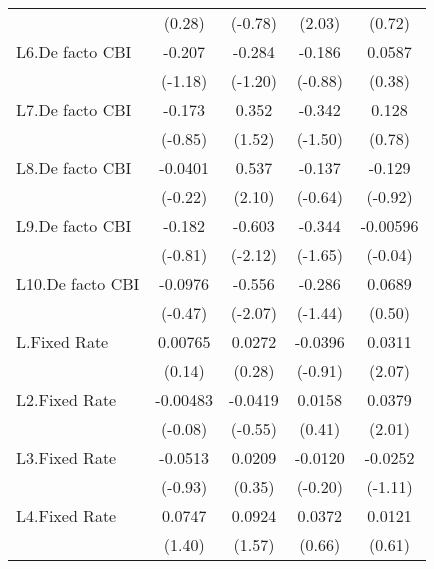 {\begin{longtable}{l*{4}{c}}
                &   (0.28)         &  (-0.78)         &   (2.03)         &   (0.72)         \\
[1em]
L6.De facto CBI &   -0.207         &   -0.284         &   -0.186         &   0.0587         \\
                &  (-1.18)         &  (-1.20)         &  (-0.88)         &   (0.38)         \\
[1em]
L7.De facto CBI &   -0.173         &    0.352         &   -0.342         &    0.128         \\
                &  (-0.85)         &   (1.52)         &  (-1.50)         &   (0.78)         \\
[1em]
L8.De facto CBI &  -0.0401         &    0.537\sym{*}  &   -0.137         &   -0.129         \\
                &  (-0.22)         &   (2.10)         &  (-0.64)         &  (-0.92)         \\
[1em]
L9.De facto CBI &   -0.182         &   -0.603\sym{*}  &   -0.344         & -0.00596         \\
                &  (-0.81)         &  (-2.12)         &  (-1.65)         &  (-0.04)         \\
[1em]
L10.De facto CBI&  -0.0976         &   -0.556\sym{*}  &   -0.286         &   0.0689         \\
                &  (-0.47)         &  (-2.07)         &  (-1.44)         &   (0.50)         \\
[1em]
L.Fixed Rate    &  0.00765         &   0.0272         &  -0.0396         &   0.0311\sym{*}  \\
                &   (0.14)         &   (0.28)         &  (-0.91)         &   (2.07)         \\
[1em]
L2.Fixed Rate   & -0.00483         &  -0.0419         &   0.0158         &   0.0379\sym{*}  \\
                &  (-0.08)         &  (-0.55)         &   (0.41)         &   (2.01)         \\
[1em]
L3.Fixed Rate   &  -0.0513         &   0.0209         &  -0.0120         &  -0.0252         \\
                &  (-0.93)         &   (0.35)         &  (-0.20)         &  (-1.11)         \\
[1em]
L4.Fixed Rate   &   0.0747         &   0.0924         &   0.0372         &   0.0121         \\
                &   (1.40)         &   (1.57)         &   (0.66)         &   (0.61)         \\

\end{longtable}}

